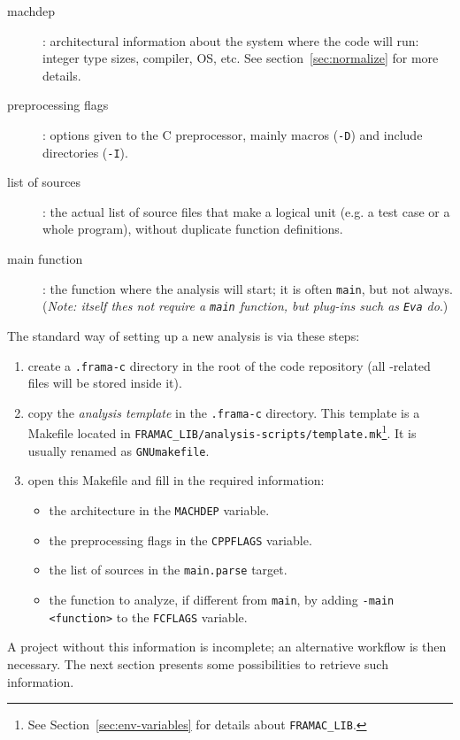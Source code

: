 \begin{description}
\item[machdep]: architectural information about the system where the code will
  run: integer type sizes, compiler, OS, etc.
  See section~\ref{sec:normalize} for more details.
\item[preprocessing flags]: options given to the C preprocessor, mainly
  macros (\texttt{-D}) and include directories (\texttt{-I}).
\item[list of sources]: the actual list of source files that make a logical
  unit (e.g. a test case or a whole program), without duplicate function
  definitions.
\item[main function]: the function where the analysis will start; it is often
  \texttt{main}, but not always. ({\em Note: \FramaC itself thes not require
    a \texttt{main} function, but plug-ins such as \texttt{Eva} do}.)
\end{description}

The standard way of setting up a new analysis is via these steps:

\begin{enumerate}
\item create a \texttt{.frama-c} directory in the root of the code repository
  (all \FramaC-related files will be stored inside it).
\item copy the {\em analysis template} in the \texttt{.frama-c} directory.
  This template is a Makefile located in
  \texttt{FRAMAC\_LIB/analysis-scripts/template.mk}\footnote{See
  Section~\ref{sec:env-variables} for details about \texttt{FRAMAC\_LIB}.}.
  It is usually renamed as \texttt{GNUmakefile}.
\item open this Makefile and fill in the required information:
  \begin{itemize}
    \item the architecture in the \texttt{MACHDEP} variable.
    \item the preprocessing flags in the \texttt{CPPFLAGS} variable.
    \item the list of sources in the \texttt{main.parse} target.
    \item the function to analyze, if different from \texttt{main}, by
    adding \texttt{-main <function>} to the \texttt{FCFLAGS} variable.
  \end{itemize}
\end{enumerate}

A project without this information is incomplete; an alternative
workflow is then necessary. The next section presents some possibilities to
retrieve such information.

